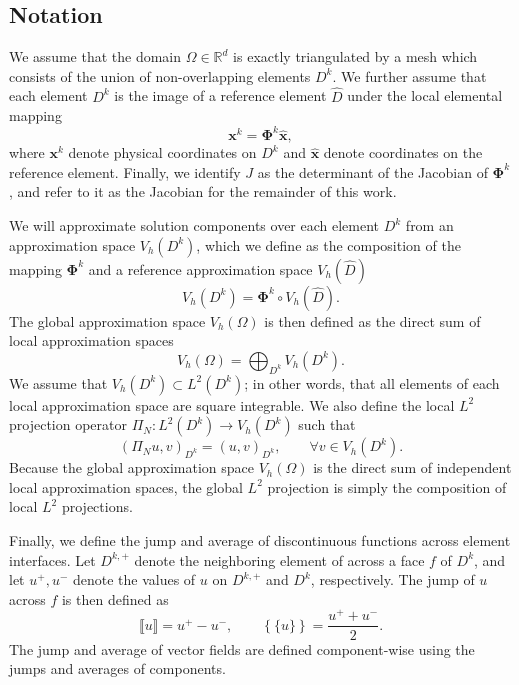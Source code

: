 \documentclass[preprint,10pt]{article}
\theoremstyle{definition}
\theoremstyle{lemma}
\theoremstyle{theorem}
\newcommand{\LRp}[1]{\left( #1 \right)}
\newcommand{\LRc}[1]{\left\{ #1 \right\}}
\newcommand{\jump}[1] {\ensuremath{\llbracket#1\rrbracket}}
\newcommand{\avg}[1] {\ensuremath{\LRc{\!\{#1\}\!}}}
\newcommand{\note}[1]{{\color{blue}{#1}}}
\begin{document}
\subsection{Notation}

We assume that the domain $\Omega \in \mathbb{R}^d$ is exactly triangulated by a mesh which consists of the union of non-overlapping elements $D^k$.  We further assume that each element $D^k$ is the image of a reference element $\widehat{D}$ under the local elemental mapping 
\[
\bm{x}^k = \bm{\Phi}^k \widehat{\bm{x}},
\]
where $\bm{x}^k$ denote physical coordinates on $D^k$ and $\widehat{\bm{x}}$ denote coordinates on the reference element.  Finally, we identify $J$ as the determinant of the Jacobian of $\bm{\Phi}^k$, and refer to it as the Jacobian for the remainder of this work.  

We will approximate solution components over each element $D^k$ from an approximation space $V_h\LRp{D^k}$, which we define as the composition of the mapping $\bm{\Phi}^k$ and a reference approximation space $V_h\LRp{\widehat{D}}$
\[
V_h\LRp{D^k} = \bm{\Phi}^k \circ V_h\LRp{\widehat{D}}.
\]
The global approximation space $V_h\LRp{\Omega}$ is then defined as the direct sum of local approximation spaces
\[
V_h\LRp{\Omega} = \bigoplus_{D^k}V_h\LRp{D^k}.  
\]
We assume that $V_h(D^k) \subset L^2(D^k)$; in other words, that all elements of each local approximation space are square integrable.  We also define the local $L^2$ projection operator $\Pi_N: L^2(D^k)\rightarrow V_h(D^k)$ such that
\[
\LRp{\Pi_N u,v}_{D^k} = \LRp{u,v}_{D^k}, \qquad \forall v\in V_h\LRp{D^k}.  
\]
Because the global approximation space $V_h\LRp{\Omega}$ is the direct sum of independent local approximation spaces, the global $L^2$ projection is simply the composition of local $L^2$ projections.  


Finally, we define the jump and average of discontinuous functions across element interfaces.  Let $D^{k,+}$ denote the neighboring element of across a face $f$ of $D^k$, and let $u^+,u^-$ denote the values of $u$ on $D^{k,+}$ and $D^k$, respectively.  The jump of $u$ across $f$ is then defined as
\[
\jump{u} = u^+ - u^-, \qquad \avg{u} = \frac{u^+ + u^-}{2}.
\]
The jump and average of vector fields are defined component-wise using the jumps and averages of components.  
\end{document}
